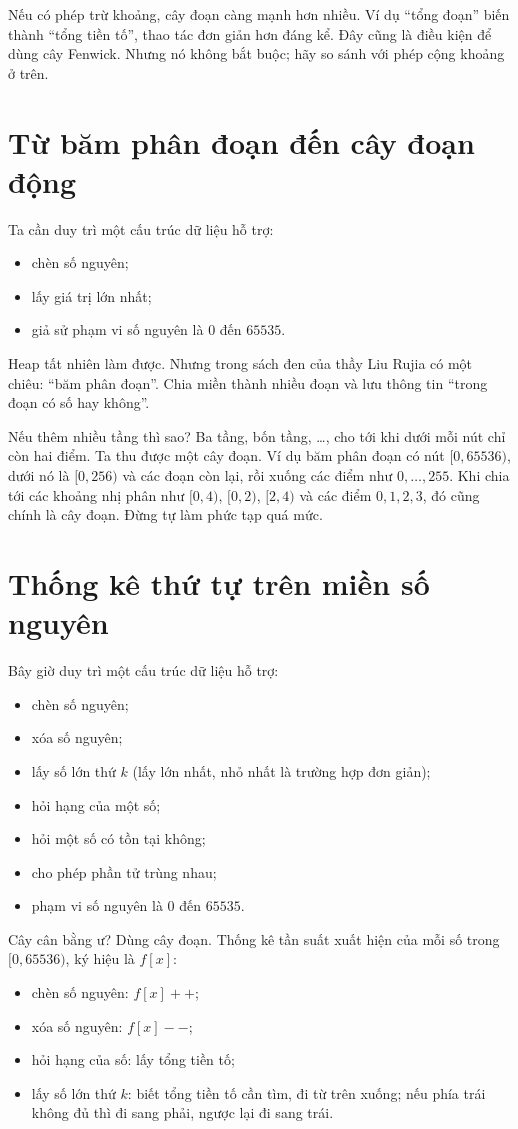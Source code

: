 \documentclass[11pt]{article}
\begin{document}
Nếu có phép trừ khoảng, cây đoạn càng mạnh hơn nhiều.  Ví dụ ``tổng đoạn''
biến thành ``tổng tiền tố'', thao tác đơn giản hơn đáng kể.  Đây cũng là điều
kiện để dùng cây Fenwick.  Nhưng nó không bắt buộc; hãy so sánh với phép cộng
khoảng ở trên.

\section{Từ băm phân đoạn đến cây đoạn động}

Ta cần duy trì một cấu trúc dữ liệu hỗ trợ:
\begin{itemize}
  \item chèn số nguyên;
  \item lấy giá trị lớn nhất;
  \item giả sử phạm vi số nguyên là $0$ đến $65535$.
\end{itemize}
Heap tất nhiên làm được.  Nhưng trong sách đen của thầy Liu Rujia có một chiêu:
``băm phân đoạn''.  Chia miền thành nhiều đoạn và lưu thông tin ``trong đoạn có
số hay không''.

Nếu thêm nhiều tầng thì sao?  Ba tầng, bốn tầng, \ldots, cho tới khi dưới mỗi
nút chỉ còn hai điểm.  Ta thu được một cây đoạn.  Ví dụ băm phân đoạn có nút
$[0,65536)$, dưới nó là $[0,256)$ và các đoạn còn lại, rồi xuống các điểm như
$0,\ldots,255$.  Khi chia tới các khoảng nhị phân như $[0,4)$, $[0,2)$,
$[2,4)$ và các điểm $0,1,2,3$, đó cũng chính là cây đoạn.  Đừng tự làm phức
tạp quá mức.

\section{Thống kê thứ tự trên miền số nguyên}

Bây giờ duy trì một cấu trúc dữ liệu hỗ trợ:
\begin{itemize}
  \item chèn số nguyên;
  \item xóa số nguyên;
  \item lấy số lớn thứ $k$ (lấy lớn nhất, nhỏ nhất là trường hợp đơn giản);
  \item hỏi hạng của một số;
  \item hỏi một số có tồn tại không;
  \item cho phép phần tử trùng nhau;
  \item phạm vi số nguyên là $0$ đến $65535$.
\end{itemize}

Cây cân bằng ư?  Dùng cây đoạn.  Thống kê tần suất xuất hiện của mỗi số trong
$[0,65536)$, ký hiệu là $f[x]$:
\begin{itemize}
  \item chèn số nguyên: $f[x]\mathrel{+}{+}$;
  \item xóa số nguyên: $f[x]\mathrel{-}{-}$;
  \item hỏi hạng của số: lấy tổng tiền tố;
  \item lấy số lớn thứ $k$: biết tổng tiền tố cần tìm, đi từ trên xuống; nếu
  phía trái không đủ thì đi sang phải, ngược lại đi sang trái.
\end{itemize}
\end{document}
